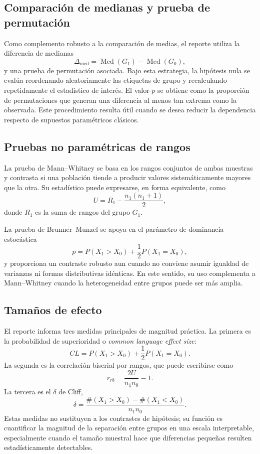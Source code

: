 \documentclass[8pt,a4paper]{article} %
\numberwithin{figure}{subsection}
\begin{document}
\subsection{Comparación de medianas y prueba de permutación}
Como complemento robusto a la comparación de medias, el reporte utiliza la diferencia de medianas
\[
\Delta_{\mathrm{med}}=\operatorname{Med}(G_1)-\operatorname{Med}(G_0),
\]
y una prueba de permutación asociada. Bajo esta estrategia, la hipótesis nula se evalúa reordenando aleatoriamente las etiquetas de grupo y recalculando repetidamente el estadístico de interés. El valor-$p$ se obtiene como la proporción de permutaciones que generan una diferencia al menos tan extrema como la observada. Este procedimiento resulta útil cuando se desea reducir la dependencia respecto de supuestos paramétricos clásicos.

\subsection{Pruebas no paramétricas de rangos}
La prueba de Mann--Whitney se basa en los rangos conjuntos de ambas muestras y contrasta si una población tiende a producir valores sistemáticamente mayores que la otra. Su estadístico puede expresarse, en forma equivalente, como
\[
U = R_1-\frac{n_1(n_1+1)}{2},
\]
donde $R_1$ es la suma de rangos del grupo $G_1$.

La prueba de Brunner--Munzel se apoya en el parámetro de dominancia estocástica
\[
p=P(X_1>X_0)+\frac{1}{2}P(X_1=X_0),
\]
y proporciona un contraste robusto aun cuando no conviene asumir igualdad de varianzas ni formas distributivas idénticas. En este sentido, su uso complementa a Mann--Whitney cuando la heterogeneidad entre grupos puede ser más amplia.

\subsection{Tamaños de efecto}
El reporte informa tres medidas principales de magnitud práctica. La primera es la probabilidad de superioridad o \textit{common language effect size}:
\[
CL=P(X_1>X_0)+\frac{1}{2}P(X_1=X_0).
\]
La segunda es la correlación biserial por rangos, que puede escribirse como
\[
r_{rb}=\frac{2U}{n_1n_0}-1.
\]
La tercera es el $\delta$ de Cliff,
\[
\delta=\frac{\#(X_1>X_0)-\#(X_1<X_0)}{n_1n_0}.
\]
Estas medidas no sustituyen a los contrastes de hipótesis; su función es cuantificar la magnitud de la separación entre grupos en una escala interpretable, especialmente cuando el tamaño muestral hace que diferencias pequeñas resulten estadísticamente detectables.
\end{document}
